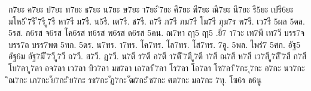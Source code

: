 {%
ก7ยะ
ค7ยะ
ป7ยะ
ท7ยะ
ธ7ยะ
น7ยะ
ษ7ยะ
า7ยะ
ิ7ยะ
คี7ยะ
ฆี7ยะ
ณี7ยะ
นี7ยะ
รี5ยะ
เปรี6ยะ
มโห5
ิ7รี
ี7รี
ู7รี
หา7รี
ม7รี.
น5รี.
เต7รี.
ช7รี.
ถ7รี
ภ7รี
ภม7รี
โม7รี
ภุม7ร
พ7รี.
เว7รี
5ผล
5ดล.
5รส.
ก6รส
จ6รส
โค6รส
ท6รส
พ6รส
ด6รส
5คน.
ณ7หา
ฤๅ5
ฤา5
.ยี่7
า7วะ
เท7พี
เท7วี
บรร7จ
บรร7ถ
บรร7พต
5ทก.
5ดร.
น7ทร.
า7ทร.
โค7ทร.
โล7ทร.
โส7ทร.
7อู.
5พล.
ไพร่7
5ศก.
อัฐ5
อัฐ6ม
อัฐ7มี
ี7วี
ู7วี
ถ7วี.
ส7วี.
ฏ7วี.
น7ตี
ร7ตี
อ7ตี
า7ตี
ิ7ตี
ู7ตี
า7สี
ณ7สี
ห7สี
เว7สี
ู7สี
ิ7สี
ก7สี
โบ7ลา
ู7ลา
อจ7ลา
เว7ลา
บิว7ลา
มข7ลา
เอ7ลา
ี7ลา
โร7ลา
โอ7ลา
โซ7ลา
ิ7กะ
ุ7กะ
อ7กะ
นว7กะ
ิณ7กะ
เภ7กะ
ัย7กะ
ิย7กะ
รธ7กะ
ัฏ7กะ
ัฒ7กะ
ิช7กะ
ศต7กะ
มล7กะ
7ทุ.
โซ6ร
ธ6นู
}
